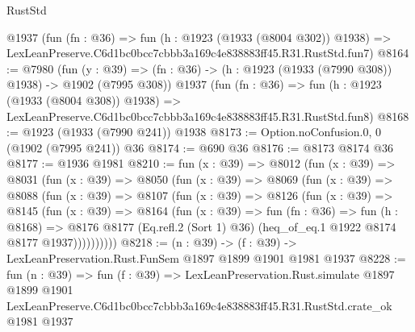 \begin{lexlean}{RustStd}
\begin{coremodule}
    @1937
    (fun (fn : @36) =>
    fun (h : @1923 (@1933 (@8004 @302)) @1938) =>
    LexLeanPreserve.C6d1bc0bcc7cbbb3a169c4e838883ff45.R31.RustStd.fun7)
@8164 := @7980
    (fun (y : @39) => (fn : @36) -> (h : @1923 (@1933 (@7990 @308)) @1938) -> @1902 (@7995 @308))
    @1937
    (fun (fn : @36) =>
    fun (h : @1923 (@1933 (@8004 @308)) @1938) =>
    LexLeanPreserve.C6d1bc0bcc7cbbb3a169c4e838883ff45.R31.RustStd.fun8)
@8168 := @1923 (@1933 (@7990 @241)) @1938
@8173 := Option.noConfusion.{0, 0} (@1902 (@7995 @241)) @36
@8174 := @690 @36
@8176 := @8173 @8174 @36
@8177 := @1936 @1981
@8210 := fun (x : @39) =>
  @8012
    (fun (x : @39) =>
    @8031
      (fun (x : @39) =>
      @8050
        (fun (x : @39) =>
        @8069
          (fun (x : @39) =>
          @8088
            (fun (x : @39) =>
            @8107
              (fun (x : @39) =>
              @8126
                (fun (x : @39) =>
                @8145
                  (fun (x : @39) =>
                  @8164
                    (fun (x : @39) =>
                    fun (fn : @36) =>
                    fun (h : @8168) =>
                    @8176
                      @8177
                      (Eq.refl.{2} (Sort 1) @36)
                      (heq_of_eq.{1} @1922 @8174 @8177 @1937))))))))))
@8218 := (n : @39) -> (f : @39) -> LexLeanPreservation.Rust.FunSem @1897 @1899 @1901 @1981 @1937
@8228 := fun (n : @39) =>
  fun (f : @39) =>
  LexLeanPreservation.Rust.simulate
    @1897
    @1899
    @1901
    LexLeanPreserve.C6d1bc0bcc7cbbb3a169c4e838883ff45.R31.RustStd.crate_ok
    @1981
    @1937
\end{coremodule}
\end{lexlean}
